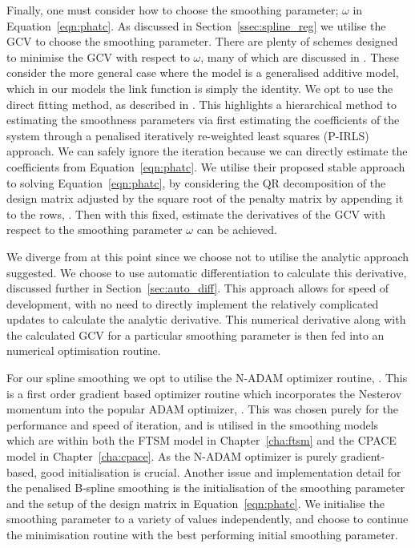 Finally, one must consider how to choose the smoothing parameter; $\omega$ in Equation~\ref{eqn:phatc}.
As discussed in Section~\ref{ssec:spline_reg} we utilise the GCV to choose the smoothing parameter.
There are plenty of schemes designed to minimise the GCV with respect to $\omega$, many of which are discussed in \citep{wood_fast_2011}.
These consider the more general case where the model is a generalised additive model, which in our models the link function is simply the identity.
We opt to use the direct fitting method, as described in \citep{wood_fast_2008}.
This highlights a hierarchical method to estimating the smoothness parameters via first estimating the coefficients of the system through a penalised iteratively re-weighted least squares (P-IRLS) approach.
We can safely ignore the iteration because we can directly estimate the coefficients from Equation~\ref{eqn:phatc}.
We utilise their proposed stable approach to solving Equation~\ref{eqn:phatc}, by considering the QR decomposition of the design matrix adjusted by the square root of the penalty matrix by appending it to the rows, \citep{wood_fast_2008}.
Then with this fixed, estimate the derivatives of the GCV with respect to the smoothing parameter $\omega$ can be achieved.

We diverge from \citep{wood_fast_2008} at this point since we choose not to utilise the analytic approach suggested.
We choose to use automatic differentiation to calculate this derivative, discussed further in Section~\ref{sec:auto_diff}.
This approach allows for speed of development, with no need to directly implement the relatively complicated updates to calculate the analytic derivative.
This numerical derivative along with the calculated GCV for a particular smoothing parameter is then fed into an numerical optimisation routine.

For our spline smoothing we opt to utilise the N-ADAM optimizer routine, \citep{dozat_incorporating_2016}.
This is a first order gradient based optimizer routine which incorporates the Nesterov momentum into the popular ADAM optimizer, \citep{dozat_incorporating_2016}.
This was chosen purely for the performance and speed of iteration, and is utilised in the smoothing models which are within both the FTSM model in Chapter~\ref{cha:ftsm} and the CPACE model in Chapter~\ref{cha:cpace}.
As the N-ADAM optimizer is purely gradient-based, good initialisation is crucial.
Another issue and implementation detail for the penalised B-spline smoothing is the initialisation of the smoothing parameter and the setup of the design matrix in Equation~\ref{eqn:phatc}.
We initialise the smoothing parameter to a variety of values independently, and choose to continue the minimisation routine with the best performing initial smoothing parameter.

